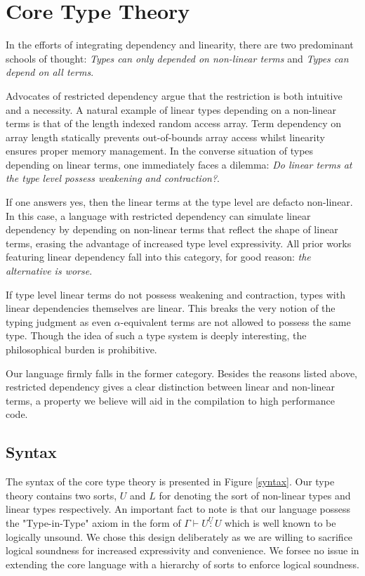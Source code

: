 \documentclass{article}
\newcommand{\utype}{\overset{U}{:}}
\begin{document}
  \section{Core Type Theory}
  In the efforts of integrating dependency and linearity, there are two predominant schools of thought: \textit{Types can only depended on non-linear terms} and \textit{Types can depend on all terms}. 
  
  Advocates of restricted dependency argue that the restriction is both intuitive and a necessity. A natural example of linear types depending on a non-linear terms is that of the length indexed random access array. Term dependency on array length statically prevents out-of-bounds array access whilst linearity ensures proper memory management. In the converse situation of types depending on linear terms, one immediately faces a dilemma: \textit{Do linear terms at the type level possess weakening and contraction?}.
  
  If one answers yes, then the linear terms at the type level are defacto non-linear. In this case, a language with restricted dependency can simulate linear dependency by depending on non-linear terms that reflect the shape of linear terms\cite{ldqt}, erasing the advantage of increased type level expressivity. All prior works featuring linear dependency fall into this category, for good reason: \textit{the alternative is worse}.
  
  If type level linear terms do not possess weakening and contraction, types with linear dependencies themselves are linear. This breaks the very notion of the typing judgment as even $\alpha$-equivalent terms are not allowed to possess the same type. Though the idea of such a type system is deeply interesting, the philosophical burden is prohibitive.
  
  Our language firmly falls in the former category. Besides the reasons listed above, restricted dependency gives a clear distinction between linear and non-linear terms, a property we believe will aid in the compilation to high performance code.
  
  \subsection{Syntax}
  The syntax of the core type theory is presented in Figure \ref{syntax}. Our type theory contains two sorts, $U$ and $L$ for denoting the sort of non-linear types and linear types respectively. An important fact to note is that our language possess the "Type-in-Type" axiom in the form of $\Gamma \vdash U \utype U$ which is well known to be logically unsound. We chose this design deliberately as we are willing to sacrifice logical soundness for increased expressivity and convenience. We forsee no issue in extending the core language with a hierarchy of sorts to enforce logical soundness.
\end{document}
